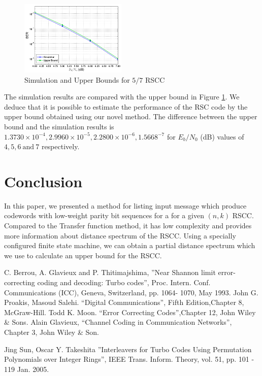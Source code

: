 \documentclass[fontsize=12pt]{article}
\begin{document}
\begin{figure}[h]
\centering
		\includegraphics[width=0.45\textwidth]{paperg2.png}
		\caption{Simulation and Upper Bounds for $5/7$ RSCC}
		\label{fig3}
		\end{figure}
		
		The simulation results are compared with the upper bound in Figure \ref{fig3}. 
	We deduce that it is possible to estimate the performance of the RSC code by the upper bound obtained using our novel method. The difference between the upper bound and the simulation results is $1.3730 \times 10^{-4}, 2.9960 \times 10^{-5},2.2800 \times 10^{-6}, 1.5668^{-7}$ for $E_b/N_0$ (dB) values of $4,5,6~\text{and}~7$ respectively. 

\section{Conclusion}
\label{sec6}

In this paper, we presented a method for listing input message which produce codewords with low-weight parity bit sequences for a for a given $(n,k)$ RSCC. Compared to the Transfer function method, it has low complexity and provides more information about distance spectrum of the RSCC. Using a specially configured finite state machine, we can obtain a partial distance spectrum which we use to calculate an upper bound for the RSCC.  





\begin{thebibliography}{99}
  C. Berrou, A. Glavieux and P. Thitimajshima, 
''Near Shannon limit error-correcting coding and
decoding: Turbo codes'', Proc. Intern. Conf. Communications (ICC), Geneva, 
Switzerland, pp. 1064-
1070, May 1993.
 John G. Proakis, Masoud Salehi. ``Digital Communications'', 
Fifth Edition,Chapter 8, McGraw-Hill.
 Todd K. Moon. ``Error Correcting Codes'',Chapter 12, John Wiley \& Sons.
Alain Glavieux, ``Channel Coding in Communication Networks'',\\ Chapter 3, John Wiley \& Son. 

 Jing Sun, Oscar Y. Takeshita ''Interleavers for Turbo Codes Using 
Permutation Polynomials over Integer Rings'', IEEE Trans. Inform. Theory, vol. 51, 
pp. 101 - 119  Jan. 2005.

\end{thebibliography}
\end{document}
